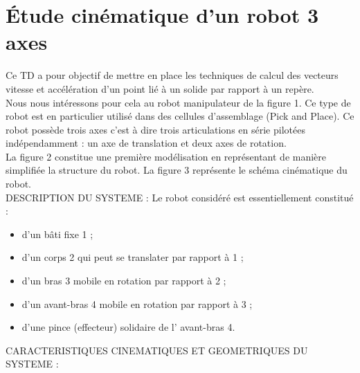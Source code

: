 \documentclass[b,k,td]{D:/Dropbox/enseignement/CPGE/raphaelpoiree/classe/classe_kara}
\begin{document}
\newcommand*{\classe}{PTSI}
\newcommand*{\partie}{Modèles}
\newcommand*{\titre}{Modèle de TD}
\newcommand*{\numero}{-1}


\section{Étude cinématique d'un robot 3 axes}
\begin{frame}
Ce TD a pour objectif de mettre en place les techniques de calcul des vecteurs vitesse et accélération d’un point
lié à un solide par rapport à un repère.\\
Nous nous intéressons pour cela au robot manipulateur de la figure 1. Ce type de robot est en particulier utilisé
dans des cellules d’assemblage (Pick and Place). Ce robot possède trois axes c'est à dire trois articulations en série
pilotées indépendamment : un axe de translation et deux axes de rotation.\\
La figure 2 constitue une première modélisation en représentant de manière simplifiée la structure du robot. La
figure 3 représente le schéma cinématique du robot.\\

DESCRIPTION DU SYSTEME :
Le robot considéré est essentiellement constitué :
\begin{itemize}
\item d’un bâti fixe 1 ;
\item d’un corps 2 qui peut se translater par rapport à 1 ;
\item d’un bras 3 mobile en rotation par rapport à 2 ;
\item d’un avant-bras 4 mobile en rotation par rapport à 3 ;
\item d’une pince (effecteur) solidaire de l' avant-bras 4.
\end{itemize}
CARACTERISTIQUES CINEMATIQUES ET GEOMETRIQUES DU SYSTEME :
\end{frame}
\begin{frame}

\end{frame}
\end{document}
